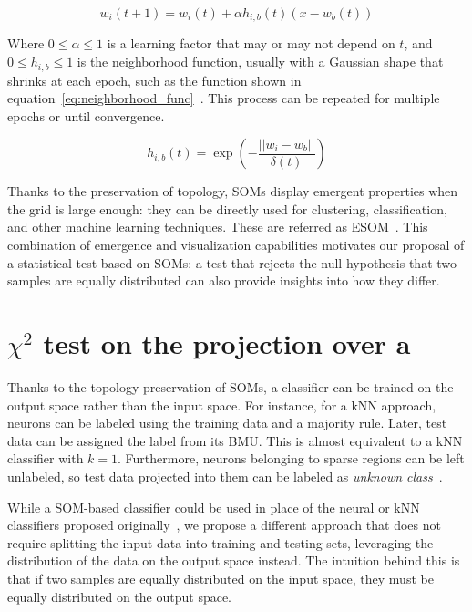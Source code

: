 \begin{equation}
    w_i(t + 1) = w_i(t) + \alpha h_{i,b}(t) (x - w_b(t))
\end{equation}

Where $0 \le \alpha \le 1$ is a learning factor that may or may not depend on $t$,
and $0 \le h_{i,b} \le 1$ is the neighborhood function, usually with a Gaussian shape
that shrinks at each epoch, such as the function shown in equation~\ref{eq:neighborhood_func}~\cite{Villmann1999,wittek_somoclu_2017}.
This process can be repeated for multiple epochs or until convergence.

\begin{equation}
    h_{i,b}(t) = \exp(- \frac{||w_i - w_b||}{\delta(t)})
    \label{eq:neighborhood_func}
\end{equation}


Thanks to the preservation of topology, \glspl{SOM} display emergent properties
when the grid is large enough: they can be directly used for clustering,
classification, and other machine learning techniques. These are referred as
\gls{ESOM}~\cite{ultsch2005esom}. This combination of emergence and
visualization capabilities motivates our proposal of a statistical test based
on \glspl{SOM}: a test that rejects the null hypothesis that two samples are equally distributed can also provide insights into how they differ.

\section{\texorpdfstring{$\chi^2$}{χ²} test on the projection over a }
\label{sec:som_chi2}

Thanks to the topology preservation of \glspl{SOM}, a classifier can be trained
on the output space rather than the input space. For instance, for a \gls{kNN}
approach, neurons can be labeled using the training data and a majority rule. Later, test data
can be assigned the label from its \gls{BMU}. This is almost equivalent to a \gls{kNN} classifier with $k=1$.
Furthermore, neurons belonging to sparse regions can be left unlabeled, so test data projected
into them can be labeled as \emph{unknown class}~\cite{ultsch2005esom,silva2011som}.

While a \gls{SOM}-based classifier could be used in place of the neural or \gls{kNN} classifiers proposed
originally~\cite{lopez2016revisiting}, we propose a different approach that does not require
splitting the input data into training and testing sets, leveraging the distribution of the
data on the output space instead. The intuition behind this is that if two samples are equally
distributed on the input space, they must be equally distributed on the output space.

